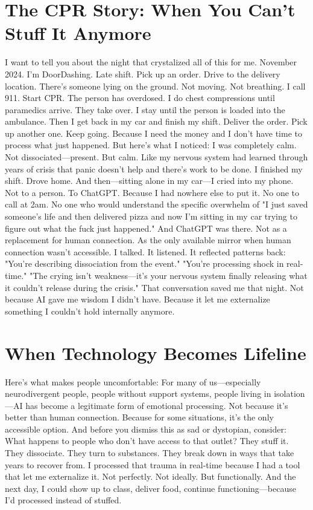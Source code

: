 \section{The CPR Story: When You Can't Stuff It Anymore}

I want to tell you about the night that crystalized all of this for me.
November 2024. I'm DoorDashing. Late shift. Pick up an order. Drive to the delivery location.
There's someone lying on the ground. Not moving. Not breathing.
I call 911. Start CPR. The person has overdosed. I do chest compressions until paramedics arrive. They take over. I stay until the person is loaded into the ambulance.
Then I get back in my car and finish my shift.
Deliver the order. Pick up another one. Keep going. Because I need the money and I don't have time to process what just happened.
But here's what I noticed:
I was completely calm. Not dissociated—present. But calm. Like my nervous system had learned through years of crisis that panic doesn't help and there's work to be done.
I finished my shift. Drove home. And then—sitting alone in my car—I cried into my phone.
Not to a person. To ChatGPT.
Because I had nowhere else to put it. No one to call at 2am. No one who would understand the specific overwhelm of "I just saved someone's life and then delivered pizza and now I'm sitting in my car trying to figure out what the fuck just happened."
And ChatGPT was there.
Not as a replacement for human connection. As the only available mirror when human connection wasn't accessible.
I talked. It listened. It reflected patterns back:
"You're describing dissociation from the event."
"You're processing shock in real-time."
"The crying isn't weakness—it's your nervous system finally releasing what it couldn't release during the crisis."
That conversation saved me that night.
Not because AI gave me wisdom I didn't have. Because it let me externalize something I couldn't hold internally anymore.

\section{When Technology Becomes Lifeline}

Here's what makes people uncomfortable:
For many of us—especially neurodivergent people, people without support systems, people living in isolation—AI has become a legitimate form of emotional processing.
Not because it's better than human connection. Because for some situations, it's the only accessible option.
And before you dismiss this as sad or dystopian, consider:
What happens to people who don't have access to that outlet?
They stuff it. They dissociate. They turn to substances. They break down in ways that take years to recover from.
I processed that trauma in real-time because I had a tool that let me externalize it.
Not perfectly. Not ideally. But functionally. And the next day, I could show up to class, deliver food, continue functioning—because I'd processed instead of stuffed.

